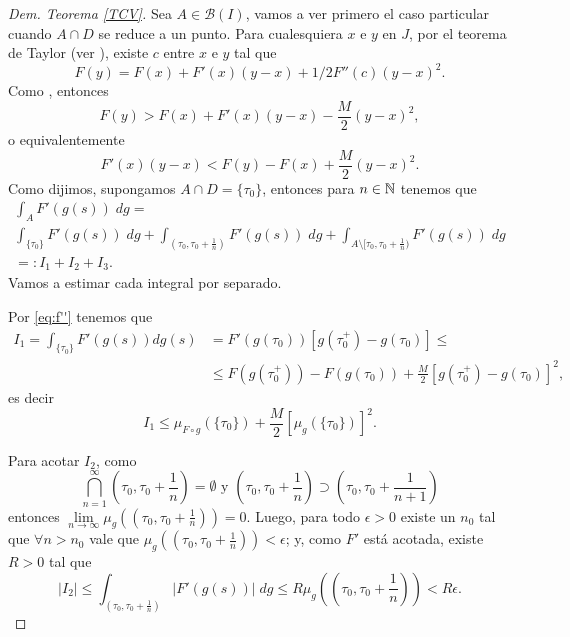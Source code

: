 \begin{proof}[Dem. Teorema \eqref{TCV}]
Sea $A\in \mathcal{B}(I)$, vamos a ver primero el caso particular \normalmarginpar{} cuando
$A\cap D$ se reduce a un punto.
 Para cualesquiera $x$ e $y$ en $J$, por el teorema de Taylor (ver \cite[pg 13]{Evans}), existe $c$ entre $x$ e $y$ tal que
		$$F(y)=F(x)+F'(x)(y-x)+1/2F''(c)(y-x)^2.$$
		Como  , \reversemarginpar{} entonces
		$$F(y)>F(x)+F'(x)(y-x)-\frac{M}{2}(y-x)^2,$$ 
		o equivalentemente 
		\begin{equation}	\label{eq:f''}
			F'(x)(y-x)<F(y)-F(x)+\frac{M}{2}(y-x)^2.
		\end{equation}
		Como dijimos, supongamos  $A\cap D=\{\tau_0\}$, entonces para $n\in \mathbb{N}$ tenemos que
		\begin{multline*}
			\int_AF'(g(s))\; dg=\\ \int_{\{\tau_0\}}F'(g(s))\; dg+\int_{(\tau_0,\tau_0+\frac{1}{n})}F'(g(s))\; dg+ \int_{A\setminus [\tau_0,\tau_0+\frac{1}{n})}F'(g(s))\; dg\\
             =:I_1+I_2+I_3.
		\end{multline*}
		Vamos a estimar cada integral por separado.
  
 Por \eqref{eq:f''} tenemos que
		\begin{equation*}
  \begin{split}
		I_1=\int_{\{\tau_0\}}F'(g(s))dg(s)&=F'(g(\tau_0))\left[g(\tau_0^+)-g(\tau_0) \right]\leq\\
		&\leq F(g(\tau_0^+))- F(g(\tau_0))+\frac{M}{2}\left[ g(\tau_0^+)-g(\tau_0)\right]^2,
  \end{split}
	\end{equation*}
	es decir
		\begin{equation}
			\label{eq:obs1}
			I_1\leq \mu_{F\circ g}(\{\tau_0\})+\frac{M}{2}\left[ \mu_{g}(\{\tau_0\})\right]^2 .
		\end{equation} 
	
Para acotar $I_2$, como $$\bigcap_{n=1}^{\infty}\left( \tau_0,\tau_0+\frac{1}{n}\right) =\emptyset \text{ y }  \left( \tau_0,\tau_0+\frac{1}{n}\right) \supset \left( \tau_0,\tau_0+\frac{1}{n+1}\right) $$
	entonces $\lim\limits_{n\to \infty}\mu_{g}\left( \left( \tau_0,\tau_0+\frac{1}{n}\right)\right)=0 $. 
Luego, para todo $\epsilon>0$ existe un $n_0$ tal que $\forall n>n_0$ vale que   $\mu_{g}\left( \left( \tau_0,\tau_0+\frac{1}{n}\right)\right)<\epsilon$; y,  como $F'$ está acotada, existe $R>0$ tal que 
\begin{equation*}
	\left|I_2\right| \leq\int_{(\tau_0,\tau_0+\frac{1}{n})}|F'(g(s))|\; dg 
  \leq R \mu_{g}\left( \left( \tau_0,\tau_0+\frac{1}{n}\right)\right)<R\epsilon. 
\end{equation*}


\end{proof}
